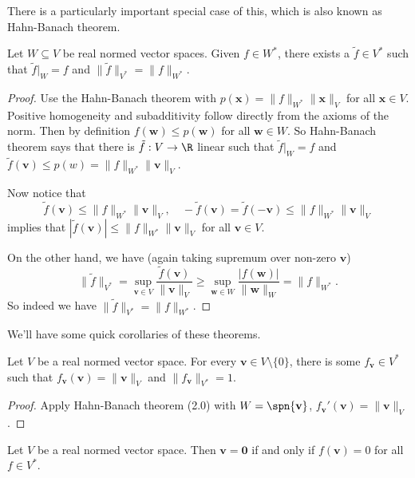 \documentclass[a4paper]{article}
\begin{document}
There is a particularly important special case of this, which is also known as Hahn-Banach theorem.
\begin{cor}
  Let $W \subseteq V$ be real normed vector spaces. Given $f \in W^*$, there exists a $\tilde{f} \in V^*$ such that $\tilde{f}|_W = f$ and $\|\tilde{f}\|_{V^*} = \|f\|_{W^*}$.
\end{cor}

\begin{proof}
  Use the Hahn-Banach theorem with $p(\mathbf{x}) = \|f\|_{W^*}\|\mathbf{x}\|_V$ for all $\mathbf{x}\in V$. Positive homogeneity and subadditivity follow directly from the axioms of the norm. Then by definition $f(\mathbf{w}) \leq p(\mathbf{w})$ for all $\mathbf{w}\in W$. So Hahn-Banach theorem says that there is $\tilde{f}: V\to \R$ linear such that $\tilde{f}|_W = f$ and $\tilde{f}(\mathbf{v}) \leq p(w) = \|f\|_{W^*} \|\mathbf{v}\|_V$.

  Now notice that
  \[
    \tilde{f}(\mathbf{v}) \leq \|f\|_{W^*}\|\mathbf{v}\|_V,\quad -\tilde{f}(\mathbf{v}) = \tilde{f}(-\mathbf{v}) \leq \|f\|_{W^*}\|\mathbf{v}\|_V
  \]
  implies that $|\tilde{f}(\mathbf{v})| \leq \|f\|_{W^*}\|\mathbf{v}\|_V$ for all $\mathbf{v}\in V$.

  On the other hand, we have (again taking supremum over non-zero $\mathbf{v}$)
  \[
    \|\tilde{f}\|_{V^*} = \sup_{\mathbf{v}\in V} \frac{\tilde{f}(\mathbf{v})}{\|\mathbf{v}\|_V} \geq \sup_{\mathbf{w}\in W} \frac{|f(\mathbf{w})|}{\|\mathbf{w}\|_W} = \|f\|_{W^*}.
  \]
  So indeed we have $\|\tilde{f}\|_{V^*} = \|f\|_{W^*}$.
\end{proof}

We'll have some quick corollaries of these theorems.
\begin{prop}
  Let $V$ be a real normed vector space. For every $\mathbf{v}\in V\setminus \{0\}$, there is some $f_{\mathbf{v}} \in V^*$ such that $f_{\mathbf{v}}(\mathbf{v}) = \|\mathbf{v}\|_V$ and $\|f_{\mathbf{v}}\|_{V^*} = 1$.
\end{prop}

\begin{proof}
  Apply Hahn-Banach theorem (2.0) with $W = \spn\{\mathbf{v}\}$, $f_{\mathbf{v}}'(\mathbf{v}) = \|\mathbf{v}\|_V$.
\end{proof}

\begin{cor}
  Let $V$ be a real normed vector space. Then $\mathbf{v} = \mathbf{0}$ if and only if $f(\mathbf{v}) = 0$ for all $f\in V^*$.
\end{cor}
\end{document}

